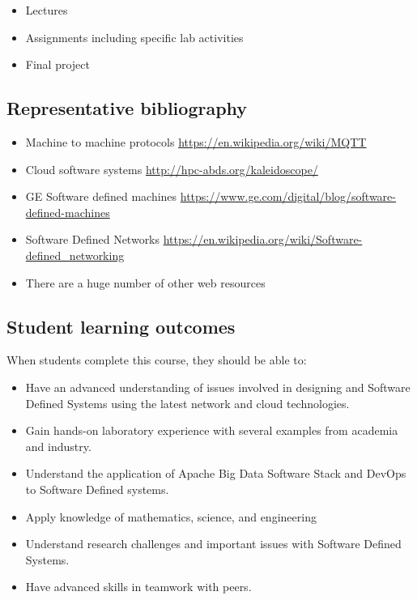 \begin{itemize}
\item Lectures
\item Assignments including specific lab activities
\item Final project 
\end{itemize}

\subsection{Representative bibliography}

\begin{itemize}
\item	Machine to machine protocols \url{https://en.wikipedia.org/wiki/MQTT}
\item	Cloud software systems \url{http://hpc-abds.org/kaleidoscope/}
\item	GE Software defined machines \url{https://www.ge.com/digital/blog/software-defined-machines}
\item	Software Defined Networks \url{https://en.wikipedia.org/wiki/Software-defined_networking}
\item	There are a huge number of other web resources
\end{itemize}

\subsection{Student learning outcomes}

When students complete this course, they should be able to:

\begin{itemize}
\item	Have an advanced understanding of issues involved in designing and Software Defined Systems using the latest network and cloud technologies.
\item	Gain hands-on laboratory experience with several examples from academia and industry.
\item	Understand the application of Apache Big Data Software Stack and DevOps to Software Defined systems.
\item	Apply knowledge of mathematics, science, and engineering
\item	Understand research challenges and important issues with Software Defined Systems.
\item	Have advanced skills in teamwork with peers.
\end{itemize}

